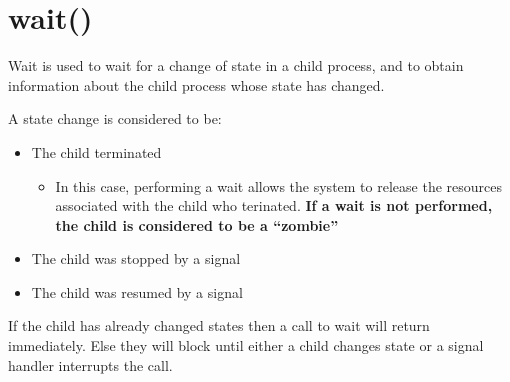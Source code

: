 
\section{wait()}

%

Wait is used to wait for a change of state in a child process, and to obtain
information about the child process whose state has changed.

A state change is considered to be:
\begin{itemize}
\item The child terminated
  \begin{itemize}
  \item In this case, performing a wait allows the system to release the
    resources associated with the child who terinated. \textbf{If a wait is not
      performed, the child is considered to be a ``zombie''}
  \end{itemize}
\item The child was stopped by a signal
\item The child was resumed by a signal
\end{itemize}

If the child has already changed states then a call to wait will return
immediately. Else they will block until either a child changes state or a signal
handler interrupts the call.

